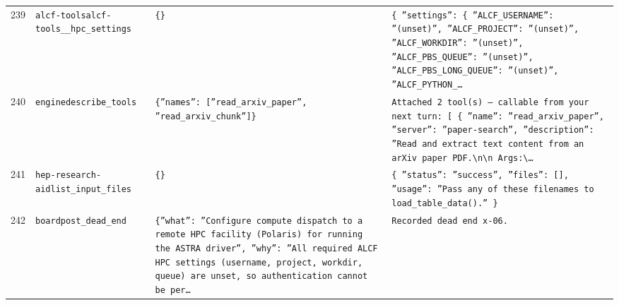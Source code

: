 \documentclass[11pt,a4paper]{article}
\begin{document}
\begin{longtable}{@{}p{}p{}p{}p{}@{}}
239 & \texttt{alcf-tools}\newline\texttt{alcf-tools\_\allowbreak{}\_\allowbreak{}hpc\_\allowbreak{}settings} & \texttt{\{\}\allowbreak{}} & \texttt{\{   ''settings'':\allowbreak{} \{     ''ALCF\_\allowbreak{}USERNAME'':\allowbreak{} ''(unset)\allowbreak{}'',\allowbreak{}     ''ALCF\_\allowbreak{}PROJECT'':\allowbreak{} ''(unset)\allowbreak{}'',\allowbreak{}     ''ALCF\_\allowbreak{}WORKDIR'':\allowbreak{} ''(unset)\allowbreak{}'',\allowbreak{}     ''ALCF\_\allowbreak{}PBS\_\allowbreak{}QUEUE'':\allowbreak{} ''(unset)\allowbreak{}'',\allowbreak{}     ''ALCF\_\allowbreak{}PBS\_\allowbreak{}LONG\_\allowbreak{}QUEUE'':\allowbreak{} ''(unset)\allowbreak{}'',\allowbreak{}     ''ALCF\_\allowbreak{}PYTHON\_\allowbreak{}\ldots{}\allowbreak{}} \\
240 & \texttt{engine}\newline\texttt{describe\_\allowbreak{}tools} & \texttt{\{''names'':\allowbreak{} [''read\_\allowbreak{}arxiv\_\allowbreak{}paper'',\allowbreak{} ''read\_\allowbreak{}arxiv\_\allowbreak{}chunk'']\allowbreak{}\}\allowbreak{}} & \texttt{Attached 2 tool(s)\allowbreak{} --- callable from your next turn:\allowbreak{} [  \{   ''name'':\allowbreak{} ''read\_\allowbreak{}arxiv\_\allowbreak{}paper'',\allowbreak{}   ''server'':\allowbreak{} ''paper-search'',\allowbreak{}   ''description'':\allowbreak{} ''Read and extract text content from an arXiv paper PDF.\textbackslash{}\allowbreak{}n\textbackslash{}\allowbreak{}n    Args:\allowbreak{}\textbackslash{}\allowbreak{}\ldots{}\allowbreak{}} \\
241 & \texttt{hep-research-aid}\newline\texttt{list\_\allowbreak{}input\_\allowbreak{}files} & \texttt{\{\}\allowbreak{}} & \texttt{\{   ''status'':\allowbreak{} ''success'',\allowbreak{}   ''files'':\allowbreak{} []\allowbreak{},\allowbreak{}   ''usage'':\allowbreak{} ''Pass any of these filenames to load\_\allowbreak{}table\_\allowbreak{}data()\allowbreak{}.'' \}\allowbreak{}} \\
242 & \texttt{board}\newline\texttt{post\_\allowbreak{}dead\_\allowbreak{}end} & \texttt{\{''what'':\allowbreak{} ''Configure compute dispatch to a remote HPC facility (Polaris)\allowbreak{} for running the ASTRA driver'',\allowbreak{} ''why'':\allowbreak{} ''All required ALCF HPC settings (username,\allowbreak{} project,\allowbreak{} workdir,\allowbreak{} queue)\allowbreak{} are unset,\allowbreak{} so authentication cannot be per\ldots{}\allowbreak{}} & \texttt{Recorded dead end x-06.} \\

\end{longtable}
\end{document}
